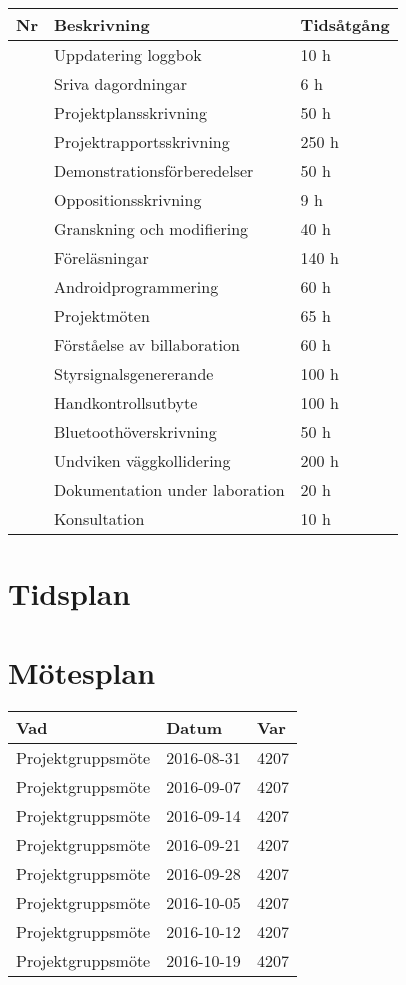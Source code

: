 \documentclass[a4paper]{article}
\begin{document}
\begin{tabular}{|l|l|l|} \hline
\bf Nr & \bf Beskrivning & \bf Tidsåtgång \\ \hline \hline
 & Uppdatering loggbok & 10 h \\ \hline
 & Sriva dagordningar & 6 h \\ \hline
 & Projektplansskrivning & 50 h \\ \hline
 & Projektrapportsskrivning & 250 h \\ \hline
 & Demonstrationsförberedelser & 50 h \\ \hline
 & Oppositionsskrivning & 9 h \\ \hline
 & Granskning och modifiering & 40 h \\ \hline
 & Föreläsningar & 140 h \\ \hline
 & Androidprogrammering & 60 h \\ \hline
 & Projektmöten & 65 h \\ \hline
 & Förståelse av billaboration & 60 h \\ \hline
 & Styrsignalsgenererande & 100 h \\ \hline
 & Handkontrollsutbyte & 100 h \\ \hline
 & Bluetoothöverskrivning & 50 h \\ \hline
 & Undviken väggkollidering & 200 h \\ \hline
 & Dokumentation under laboration & 20 h \\ \hline
 & Konsultation & 10 h \\ \hline
 
\end{tabular}

\section{Tidsplan}

\section{Mötesplan}

\begin{tabular}{|l|l|l|} \hline
\bf Vad & \bf Datum & \bf Var \\ \hline \hline
Projektgruppsmöte & 2016-08-31 & 4207 \\ \hline
Projektgruppsmöte & 2016-09-07 & 4207 \\ \hline
Projektgruppsmöte & 2016-09-14 & 4207 \\ \hline
Projektgruppsmöte & 2016-09-21 & 4207 \\ \hline
Projektgruppsmöte & 2016-09-28 & 4207 \\ \hline
Projektgruppsmöte & 2016-10-05 & 4207 \\ \hline
Projektgruppsmöte & 2016-10-12 & 4207 \\ \hline
Projektgruppsmöte & 2016-10-19 & 4207 \\ \hline
\end{tabular}
\end{document}
